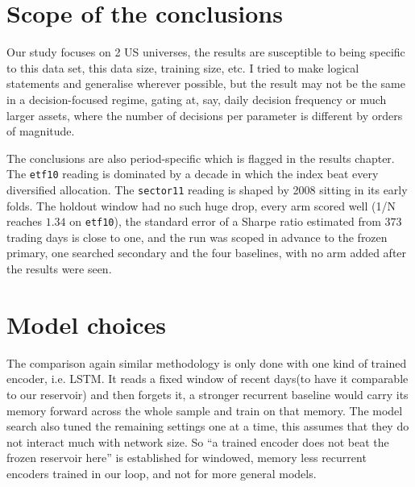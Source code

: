 \section{Scope of the conclusions}
\label{sec:lim-scope}

Our study focuses on 2 US universes, the results are susceptible to being specific to this data set, this data size, training size, etc. 
I tried to make logical statements and generalise wherever possible, but the result may not be the same in a decision-focused regime, gating at, say, daily decision frequency or much larger assets, where the number of decisions per parameter is different by orders of magnitude.

The conclusions are also period-specific which is flagged in the results chapter. The \texttt{etf10} reading is dominated by a decade in which the index beat every diversified allocation. The \texttt{sector11} reading is shaped by 2008 sitting in its early folds. The holdout window had no such huge drop, every arm scored well (1/N reaches $1.34$ on \texttt{etf10}), the standard error of a Sharpe ratio estimated from $373$ trading days is close to one, and the run was scoped in advance to the frozen primary, one searched secondary and the four baselines, with no arm added after the results were seen.

\section{Model choices}
\label{sec:lim-model}

The comparison again similar methodology is only done with one kind of trained encoder, i.e. LSTM. It reads a fixed window of recent days(to have it comparable to our reservoir) and then forgets it, a stronger recurrent baseline would carry its memory forward across the whole sample and train on that memory. The model search also tuned the remaining settings one at a time, this assumes that they do not interact much with network size. So ``a trained encoder does not beat the frozen reservoir here'' is established for windowed, memory less recurrent encoders trained in our loop, and not for more general models.

